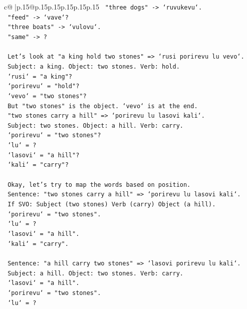 \documentclass{article}
\begin{document}
{\begin{supertabular}{c@{$\;$}|p{.15\linewidth}@{}p{.15\linewidth}p{.15\linewidth}p{.15\linewidth}p{.15\linewidth}p{.15\linewidth}}
{{{\texttt{   "three dogs" {-}> `ruvukevu`.} \\
\texttt{   "feed" {-}> `vave`?} \\
\texttt{   "three boats" {-}> `vulovu`.} \\
\texttt{   "same" {-}> ?} \\
\\ 
\texttt{   Let's look at "a king hold two stones" => `rusi porirevu lu vevo`.} \\
\texttt{   Subject: a king. Object: two stones. Verb: hold.} \\
\texttt{   `rusi` = "a king"?} \\
\texttt{   `porirevu` = "hold"?} \\
\texttt{   `vevo` = "two stones"?} \\
\texttt{   But "two stones" is the object. `vevo` is at the end.} \\
\texttt{   "two stones carry a hill" => `porirevu lu lasovi kali`.} \\
\texttt{   Subject: two stones. Object: a hill. Verb: carry.} \\
\texttt{   `porirevu` = "two stones"?} \\
\texttt{   `lu` = ?} \\
\texttt{   `lasovi` = "a hill"?} \\
\texttt{   `kali` = "carry"?} \\
\\ 
\texttt{   Okay, let's try to map the words based on position.} \\
\texttt{   Sentence: "two stones carry a hill" => `porirevu lu lasovi kali`.} \\
\texttt{   If SVO: Subject (two stones) Verb (carry) Object (a hill).} \\
\texttt{   `porirevu` = "two stones".} \\
\texttt{   `lu` = ?} \\
\texttt{   `lasovi` = "a hill".} \\
\texttt{   `kali` = "carry".} \\
\\ 
\texttt{   Sentence: "a hill carry two stones" => `lasovi porirevu lu kali`.} \\
\texttt{   Subject: a hill. Object: two stones. Verb: carry.} \\
\texttt{   `lasovi` = "a hill".} \\
\texttt{   `porirevu` = "two stones".} \\
\texttt{   `lu` = ?} \\
}}}
\end{supertabular}}
\end{document}
